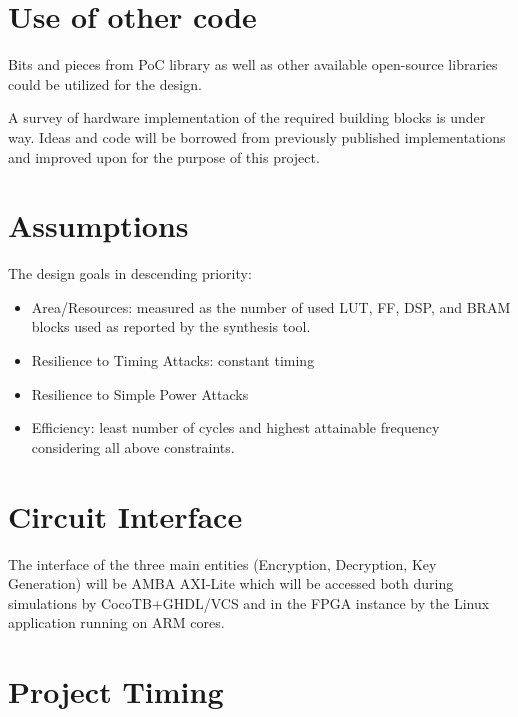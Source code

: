  \chapter{Use of other code}

 Bits and pieces from PoC library \cite{poc} as well as other available open-source libraries could be utilized for the design. 


A survey of hardware implementation of the required building blocks is under way. Ideas and code will be borrowed from previously published implementations and improved upon 
 for the purpose of this project.


 \chapter{Assumptions}

 The design goals in descending priority:
 \begin{itemize}
     \item Area/Resources: measured as the number of used LUT, FF, DSP, and BRAM blocks used as reported by the synthesis tool.
     \item Resilience to Timing Attacks: constant timing
     \item Resilience to Simple Power Attacks
     \item Efficiency: least number of cycles and highest attainable frequency considering all above constraints.  
 \end{itemize}

 \chapter{Circuit Interface}
 The interface of the three main entities (Encryption, Decryption, Key Generation) will 
 be AMBA AXI-Lite which will be accessed both during simulations by CocoTB+GHDL/VCS and 
 in the FPGA instance by the Linux application running on ARM cores. 

 \chapter{Project Timing}

